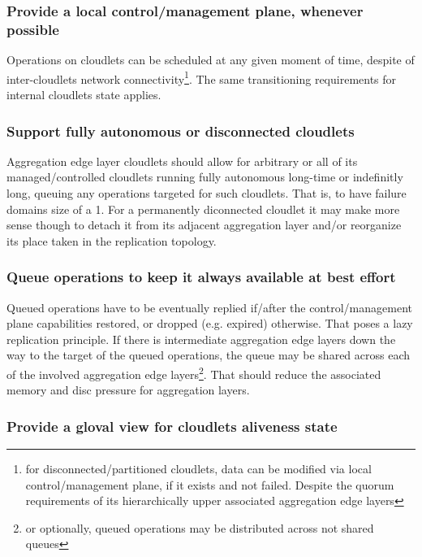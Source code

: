 \documentclass[conference]{IEEEtran}
\begin{document}
\subsubsection{Provide a local control/management plane, whenever possible}

Operations on cloudlets can be scheduled at any given moment of time, despite
of inter-cloudlets network connectivity\footnote{for disconnected/partitioned
cloudlets, data can be modified via local control/management plane, if it
exists and not failed. Despite the quorum requirements of its hierarchically
upper associated aggregation edge layers}. The same transitioning requirements
for internal cloudlets state applies.

\subsubsection{Support fully autonomous or disconnected cloudlets}

Aggregation edge layer cloudlets should allow for arbitrary or all of its
managed/controlled cloudlets running fully autonomous long-time or indefinitly
long, queuing any operations targeted for such cloudlets. That is, to have
failure domains size of a 1. For a permanently diconnected cloudlet it may make
more sense though to detach it from its adjacent aggregation layer and/or
reorganize its place taken in the replication topology.

\subsubsection{Queue operations to keep it always available at best
effort}

Queued operations have to be eventually replied if/after the control/management
plane capabilities restored, or dropped (e.g. expired) otherwise. That poses a
lazy replication principle. If there is intermediate aggregation edge layers
down the way to the target of the queued operations, the queue may be shared
across each of the involved aggregation edge layers\footnote{or optionally,
queued operations may be distributed across not shared queues}. That should
reduce the associated memory and disc pressure for aggregation layers.

\subsubsection{Provide a gloval view for cloudlets aliveness state}
\end{document}
